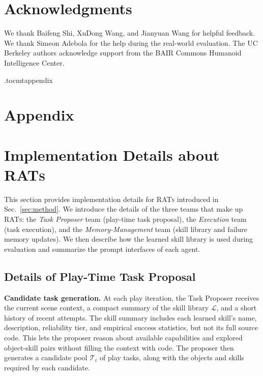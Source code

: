 \documentclass{llmxive}
\begin{document}
\section*{Acknowledgments}
We thank Baifeng Shi, XuDong Wang, and Jianyuan Wang for helpful feedback. We thank Simeon Adebola for the help during the real-world evaluation. The UC Berkeley authors acknowledge support from the BAIR Commons Humanoid Intelligence Center.




\appendix

\etocdepthtag.toc{mtappendix}



\section*{Appendix}

\begingroup
  \parskip0pt
  \tableofcontents
\endgroup



\section{Implementation Details about \textsc{RATs}}
\label{sec:appendix_agent_team}
This section provides implementation details for \textsc{RATs}
introduced in Sec.~\ref{sec:method}. 
We introduce the details of the three teams that make up \textsc{RATs}: the \emph{Task Proposer} team (play-time task proposal), the \emph{Execution} team (task execution), and the \emph{Memory-Management} team (skill library and failure memory updates).
We then describe how the learned skill
library is used during evaluation and summarize the prompt interfaces of each
agent.


\subsection{Details of Play-Time Task Proposal}
\label{sec:appendix_task_proposal}

\textbf{Candidate task generation.}
At each play iteration, the Task Proposer receives the current scene context, a
compact summary of the skill library $\mathcal{L}$, and a short history of
recent attempts. The skill summary includes each learned skill's name,
description, reliability tier, and empirical success statistics, but not its
full source code. This lets the proposer reason about available capabilities
and explored object-skill pairs without filling the context with code. The
proposer then generates a candidate pool $\mathcal{T}_t$ of play tasks, along
with the objects and skills required by each candidate.
\end{document}
